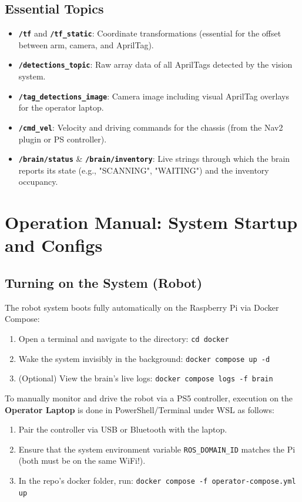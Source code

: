 \documentclass[12pt,a4paper]{article}
\begin{document}
\subsection{Essential Topics}
\begin{itemize}
    \item \textbf{\texttt{/tf}} and \textbf{\texttt{/tf\_static}}: Coordinate transformations (essential for the offset between arm, camera, and AprilTag).
    \item \textbf{\texttt{/detections\_topic}}: Raw array data of all AprilTags detected by the vision system.
    \item \textbf{\texttt{/tag\_detections\_image}}: Camera image including visual AprilTag overlays for the operator laptop.
    \item \textbf{\texttt{/cmd\_vel}}: Velocity and driving commands for the chassis (from the Nav2 plugin or PS controller).
    \item \textbf{\texttt{/brain/status}} \& \textbf{\texttt{/brain/inventory}}: Live strings through which the brain reports its state (e.g., "SCANNING", "WAITING") and the inventory occupancy.
\end{itemize}

\section{Operation Manual: System Startup and Configs}

\subsection{Turning on the System (Robot)}
The robot system boots fully automatically on the Raspberry Pi via Docker Compose:
\begin{enumerate}
    \item Open a terminal and navigate to the directory: \texttt{cd docker}
    \item Wake the system invisibly in the background: \texttt{docker compose up -d}
    \item (Optional) View the brain's live logs: \texttt{docker compose logs -f brain}
\end{enumerate}

To manually monitor and drive the robot via a PS5 controller, execution on the \textbf{Operator Laptop} is done in PowerShell/Terminal under WSL as follows:
\begin{enumerate}
    \item Pair the controller via USB or Bluetooth with the laptop.
    \item Ensure that the system environment variable \texttt{ROS\_DOMAIN\_ID} matches the Pi (both must be on the same WiFi!).
    \item In the repo's docker folder, run: \texttt{docker compose -f operator-compose.yml up}
\end{enumerate}
\end{document}
